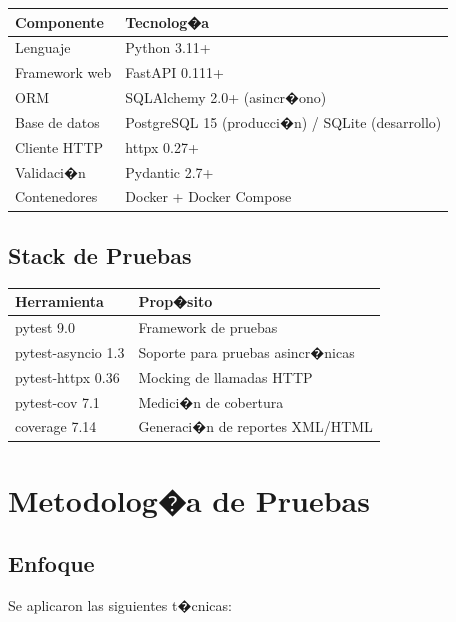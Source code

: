 \documentclass[12pt,a4paper]{article}
\begin{document}
\begin{tabularx}{\textwidth}{lX}
  \toprule
  \textbf{Componente} & \textbf{Tecnolog�a} \\
  \midrule
  Lenguaje & Python 3.11+ \\
  Framework web & FastAPI 0.111+ \\
  ORM & SQLAlchemy 2.0+ (asincr�ono) \\
  Base de datos & PostgreSQL 15 (producci�n) / SQLite (desarrollo) \\
  Cliente HTTP & httpx 0.27+ \\
  Validaci�n & Pydantic 2.7+ \\
  Contenedores & Docker + Docker Compose \\
  \bottomrule
\end{tabularx}

\subsection{Stack de Pruebas}

\begin{tabularx}{\textwidth}{lX}
  \toprule
  \textbf{Herramienta} & \textbf{Prop�sito} \\
  \midrule
  pytest 9.0 & Framework de pruebas \\
  pytest-asyncio 1.3 & Soporte para pruebas asincr�nicas \\
  pytest-httpx 0.36 & Mocking de llamadas HTTP \\
  pytest-cov 7.1 & Medici�n de cobertura \\
  coverage 7.14 & Generaci�n de reportes XML/HTML \\
  \bottomrule
\end{tabularx}

\section{Metodolog�a de Pruebas}

\subsection{Enfoque}

Se aplicaron las siguientes t�cnicas:
\end{document}
